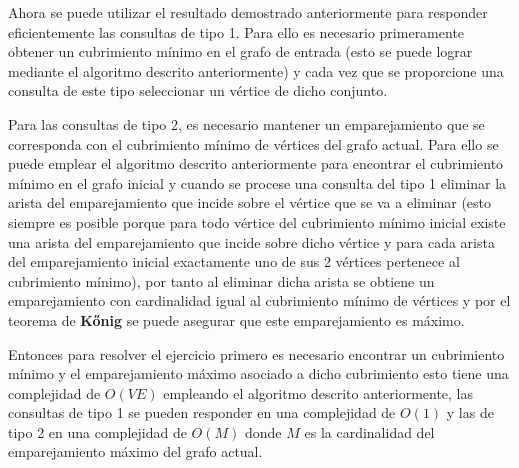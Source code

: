 \documentclass{article}
\begin{document}
Ahora se puede utilizar el resultado demostrado anteriormente para responder eficientemente las consultas de tipo 1. Para ello es necesario
primeramente obtener un cubrimiento mínimo en el grafo de entrada (esto se puede lograr mediante el algoritmo descrito anteriormente)
y cada vez que se proporcione una consulta de este tipo seleccionar un vértice de dicho conjunto.

Para las consultas de tipo 2, es necesario mantener un emparejamiento que se corresponda con el cubrimiento mínimo de vértices del grafo actual.
Para ello se puede emplear el algoritmo descrito anteriormente para encontrar el cubrimiento mínimo en el grafo inicial
y cuando se procese una consulta del tipo 1 eliminar la arista del emparejamiento que incide sobre el vértice que se va a eliminar (esto siempre
es posible porque para todo vértice del cubrimiento mínimo inicial existe una arista del emparejamiento que incide sobre dicho vértice
y para cada arista del emparejamiento inicial exactamente uno de sus 2 vértices pertenece al cubrimiento mínimo), por tanto al eliminar dicha arista
se obtiene un emparejamiento con cardinalidad igual al cubrimiento mínimo de vértices y por el teorema de \textbf{Kőnig} se puede asegurar
que este emparejamiento es máximo.

Entonces para resolver el ejercicio primero es necesario encontrar un cubrimiento mínimo y el emparejamiento máximo asociado a dicho cubrimiento
esto tiene una complejidad de $O(VE)$ empleando el algoritmo descrito anteriormente, las consultas de tipo 1 se pueden responder en una
complejidad de $O(1)$ y las de tipo 2 en una complejidad de $O(M)$ donde $M$ es la cardinalidad del emparejamiento máximo del grafo actual.
\end{document}
